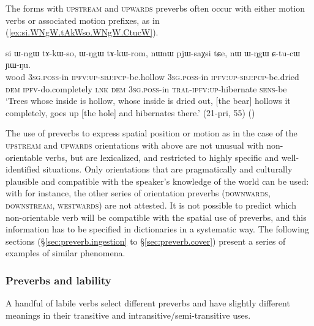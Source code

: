 
The forms with \textsc{upstream} and \textsc{upwards} preverbs often occur with either motion verbs or associated motion prefixes, as in (\ref{ex:si.WNgW.tAkWso.WNgW.CtucW}).

\begin{exe}
\ex \label{ex:si.WNgW.tAkWso.WNgW.CtucW}
\gll  si ɯ-ngɯ tɤ-kɯ-so, ɯ-ŋgɯ tɤ-kɯ-rom, nɯnɯ pjɯ-saχsi tɕe, nɯ ɯ-ŋgɯ ɕ-tu-cɯ ɲɯ-ŋu.\\
wood \textsc{3sg}.\textsc{poss}-in \textsc{ipfv}:\textsc{up}-\textsc{sbj}:\textsc{pcp}-be.hollow \textsc{3sg}.\textsc{poss}-in \textsc{ipfv}:\textsc{up}-\textsc{sbj}:\textsc{pcp}-be.dried \textsc{dem} \textsc{ipfv}-do.completely \textsc{lnk} \textsc{dem} \textsc{3sg}.\textsc{poss}-in \textsc{tral}-\textsc{ipfv}:\textsc{up}-hibernate \textsc{sens}-be \\
\glt `Trees whose inside is hollow, whose inside is dried out, [the bear] hollows it completely, goes up [the hole] and hibernates there.' (21-pri, 55) ()
\end{exe}

The use of preverbs to express spatial position or motion as in the case of the \textsc{upstream} and \textsc{upwards} orientations with  above are not unusual with non-orientable verbs, but are lexicalized, and restricted to highly specific and well-identified situations. Only orientations that are pragmatically and culturally plausible and compatible with the speaker's knowledge of the world can be used: with  for instance, the other series of  orientation preverbs (\textsc{downwards}, \textsc{downstream}, \textsc{westwards}) are not attested. It is not possible to predict which non-orientable verb will be compatible with the spatial use of preverbs, and this information has to be specified in dictionaries in a systematic way. The following sections (§\ref{sec:preverb.ingestion} to §\ref{sec:preverb.cover}) present a series of examples of similar phenomena.

\subsubsection{Preverbs and lability} \label{sec:orientation.lability}
A handful of labile verbs select different preverbs and have slightly different meanings in their transitive and intransitive/semi-transitive uses.

